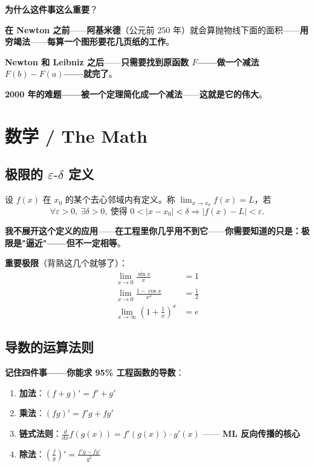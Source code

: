 \textbf{为什么这件事这么重要}？

\textbf{在 Newton 之前}——\textbf{阿基米德}（公元前 250 年）就会算抛物线下面的面积——\textbf{用穷竭法}——\textbf{每算一个图形要花几页纸的工作}。

\textbf{Newton 和 Leibniz 之后}——\textbf{只需要找到原函数 $F$——做一个减法 $F(b)-F(a)$——就完了}。

\textbf{2000 年的难题——被一个定理简化成一个减法}——\textbf{这就是它的伟大}。

\section{数学 / The Math}

\subsection{极限的 $\varepsilon\text{-}\delta$ 定义}

\begin{definition}[函数极限]
设 $f(x)$ 在 $x_0$ 的某个去心邻域内有定义。称 $\lim_{x\to x_0} f(x) = L$，若
\[
\forall \varepsilon > 0,\ \exists \delta > 0,\ \text{使得 } 0<|x-x_0|<\delta \Rightarrow |f(x)-L|<\varepsilon.
\]
\end{definition}

\textbf{我不展开这个定义的应用}——\textbf{在工程里你几乎用不到它}——\textbf{你需要知道的只是：极限是"逼近"——但不一定相等}。

\textbf{重要极限}（背熟这几个就够了）：
\begin{align}
\lim_{x \to 0} \frac{\sin x}{x} &= 1 \\
\lim_{x \to 0} \frac{1 - \cos x}{x^2} &= \frac{1}{2} \\
\lim_{x \to \infty} \left(1 + \frac{1}{x}\right)^x &= e
\end{align}

\subsection{导数的运算法则}

\textbf{记住四件事——你能求 95\% 工程函数的导数}：

\begin{enumerate}
\item \textbf{加法}：$(f+g)' = f' + g'$
\item \textbf{乘法}：$(fg)' = f'g + fg'$
\item \textbf{链式法则}：$\frac{d}{dx}f(g(x)) = f'(g(x)) \cdot g'(x)$ —— \textbf{ML 反向传播的核心}
\item \textbf{除法}：$\left(\frac{f}{g}\right)' = \frac{f'g - fg'}{g^2}$
\end{enumerate}

